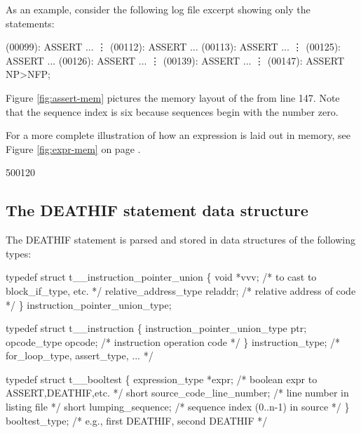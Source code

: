 As an example, consider the following log file excerpt showing only
the  statements:
\begin{logfileexample}
(00099): ASSERT ...
         \vdots
(00112): ASSERT ...
(00113): ASSERT ...
         \vdots
(00125): ASSERT ...
(00126): ASSERT ...
         \vdots
(00139): ASSERT ...
         \vdots
(00147): ASSERT NP>NFP;
\end{logfileexample}

Figure \ref{fig:assert-mem} pictures the memory layout of the  from
line 147.  Note that the sequence index is six because sequences begin with
the number zero.

For a more complete illustration of how an expression is laid out in
memory, see Figure \ref{fig:expr-mem} on page \pageref{fig:expr-mem}.

\startfig
\begin{fast_picture}{500}{120}
\savFboxpos
{}
      \stackBbox
      \nextBbox{}
      \nextBbox{}
      \nextBbox{}
\nextFbox{}
\end{fast_picture}

\subsection{The DEATHIF statement data structure}
\label{sec:deathif}

The DEATHIF statement is parsed
and stored in data structures of the following types:
\begin{codeexample}
typedef struct t__instruction_pointer_union
   \{
       void *vvv;                      /* to cast to block_if_type, etc. */
       relative_address_type reladdr;  /* relative address of code */
   \} instruction_pointer_union_type;
\end{codeexample}

\begin{codeexample}
typedef struct t__instruction
   \{
       instruction_pointer_union_type ptr;
       opcode_type opcode;      /* instruction operation code */
   \} instruction_type;          /*    for_loop_type, assert_type, ... */
\end{codeexample}

\begin{codeexample}
typedef struct t__booltest
   \{
       expression_type *expr;         /* boolean expr to ASSERT,DEATHIF,etc. */
       short source_code_line_number; /* line number in listing file */
       short lumping_sequence;        /* sequence index (0..n-1) in source */
   \} booltest_type;                   /* e.g., first DEATHIF, second DEATHIF */
\end{codeexample}

